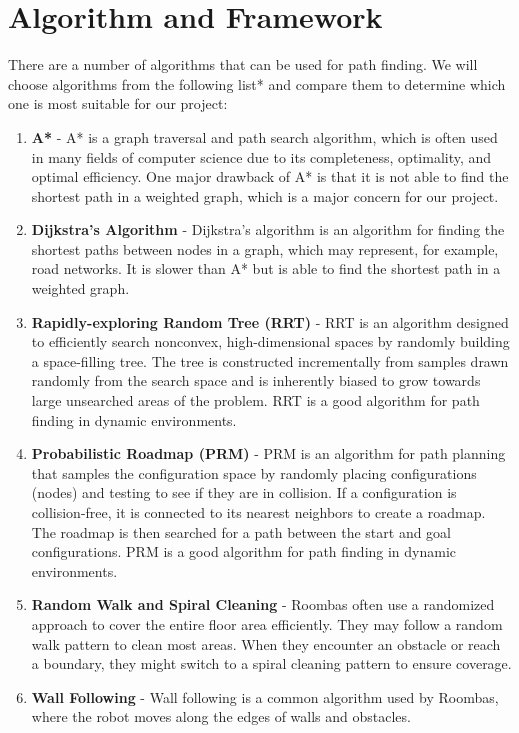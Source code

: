 \documentclass[12pt]{article}
\begin{document}
\section{Algorithm and Framework}
There are a number of algorithms that can be used for path finding. We will
choose algorithms from the following list* and compare them to determine which
one is most suitable for our project:

\begin{enumerate}
    \item \textbf{A*} - A* is a graph traversal and path search algorithm, which is often used in many fields of computer science due to its completeness, optimality, and optimal efficiency. One major drawback of A* is that it is not able to find the shortest path in a weighted graph, which is a major concern for our project.
    \item \textbf{Dijkstra's Algorithm} - Dijkstra's algorithm is an algorithm for finding the shortest paths between nodes in a graph, which may represent, for example, road networks. It is slower than A* but is able to find the shortest path in a weighted graph.
    \item \textbf{Rapidly-exploring Random Tree (RRT)} - RRT is an algorithm designed to efficiently search nonconvex, high-dimensional spaces by randomly building a space-filling tree. The tree is constructed incrementally from samples drawn randomly from the search space and is inherently biased to grow towards large unsearched areas of the problem. RRT is a good algorithm for path finding in dynamic environments.
    \item \textbf{Probabilistic Roadmap (PRM)} - PRM is an algorithm for path planning that samples the configuration space by randomly placing configurations (nodes) and testing to see if they are in collision. If a configuration is collision-free, it is connected to its nearest neighbors to create a roadmap. The roadmap is then searched for a path between the start and goal configurations. PRM is a good algorithm for path finding in dynamic environments.
    \item \textbf{Random Walk and Spiral Cleaning} - Roombas often use a randomized approach to cover the entire floor area efficiently. They may follow a random walk pattern to clean most areas. When they encounter an obstacle or reach a boundary, they might switch to a spiral cleaning pattern to ensure coverage.
    \item \textbf{Wall Following} - Wall following is a common algorithm used by Roombas, where the robot moves along the edges of walls and obstacles.
\end{enumerate}
\end{document}
